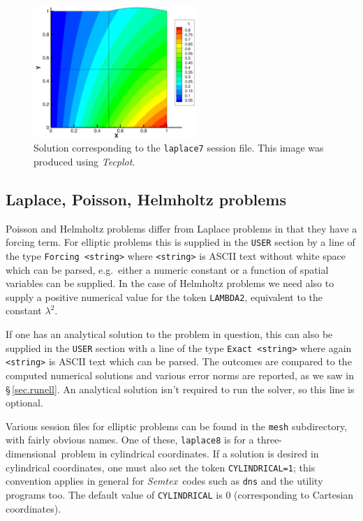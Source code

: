 \documentclass[11pt]{report}
\newcommand{\Semtex}{\emph{Semtex}} \newcommand{\Dog}{\emph{Dog}}
\newcommand{\Tecplot}{\emph{Tecplot}}
\newcommand\threed{three-di\-men\-sion\-al}
\newcommand{\eg}{e.g.\ } \newcommand{\CC}{\mathrm{c.c.}}
\begin{document}
\begin{figure}
\begin{center}
\includegraphics[width=0.55\textwidth]{laplace6cont}
\end{center}
\caption{ Solution corresponding to the \texttt{laplace7} session
  file.  This image was produced using \Tecplot.  }
\label{fig.lapcont}
\end{figure}

\subsection{Laplace, Poisson, Helmholtz problems}

Poisson and Helmholtz problems differ from Laplace problems in that
they have a forcing term.  For elliptic problems this is supplied in
the \verb|USER| section by a line of the type \verb|Forcing <string>|
where \verb|<string>| is ASCII text without white space which can be
parsed, \eg either a numeric constant or a function of spatial
variables can be supplied.  In the case of Helmholtz problems we need
also to supply a positive numerical value for the token
\verb|LAMBDA2|, equivalent to the constant $\lambda^2$.

If one has an analytical solution to the problem in question, this can
also be supplied in the \verb|USER| section with a line of the type
\verb|Exact <string>| where again \verb|<string>| is ASCII text which
can be parsed.  The outcomes are compared to the computed numerical
solutions and various error norms are reported, as we saw in
\S\,\ref{sec.runell}.  An analytical solution isn't required to run
the solver, so this line is optional.

Various session files for elliptic problems can be found in the
\verb|mesh| subdirectory, with fairly obvious names. One of these,
\verb|laplace8| is for a \threed\ problem in cylindrical coordinates.
If a solution is desired in cylindrical coordinates, one must also set
the token \verb|CYLINDRICAL=1|; this convention applies in general for
\Semtex\ codes such as \verb|dns| and the utility programs too.  The
default value of \verb|CYLINDRICAL| is 0 (corresponding to Cartesian
coordinates).
\end{document}
